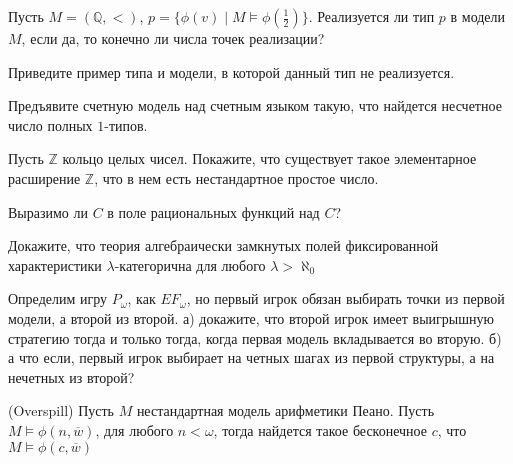 \setcounter{curtask}{20}


\begin{task}
    Пусть $M = (\mathbb{Q}, <)$, $p = \{\phi(v) \mid M \models \phi(\frac{1}{2})\}$.
    Реализуется ли тип $p$ в модели $M$, если да, то конечно ли числа точек реализации?
\end{task}

\begin{task}
    Приведите пример типа и модели, в которой данный тип не реализуется.
\end{task}

\begin{task}
    Предъявите счетную модель над счетным языком такую, что найдется несчетное число
    полных $1$-типов.
\end{task}

\begin{task}
    Пусть $\mathbb{Z}$ кольцо целых чисел. Покажите, что существует такое
    элементарное расширение $\mathbb{Z}$, что в нем есть нестандартное простое
    число.
\end{task}

\breakline


\begin{ptask}{12}
    Выразимо ли $C$ в поле рациональных функций над $C$?
\end{ptask}

\begin{ptask}{13}
    Докажите, что теория алгебраически замкнутых полей фиксированной характеристики
    $\lambda$-категорична для любого $\lambda > \aleph_0$
\end{ptask}

\begin{ptask}{17}
    Определим игру $P_{\omega}$, как $EF_{\omega}$, но первый игрок обязан выбирать
    точки из первой модели, а второй из второй.
	а) докажите, что второй игрок имеет выигрышную стратегию тогда и только тогда,
    когда первая модель вкладывается во вторую.
    б) а что если, первый игрок выбирает на четных шагах из первой структуры, а на
    нечетных из второй?
\end{ptask}

\begin{ptask}{19}(Overspill)
    Пусть $M$ нестандартная модель арифметики Пеано. Пусть
    $M \models \phi(n, \overline{w})$, для любого $n < \omega$, тогда найдется такое
    бесконечное $c$, что $M \models \phi(c, \overline{w})$
\end{ptask}
